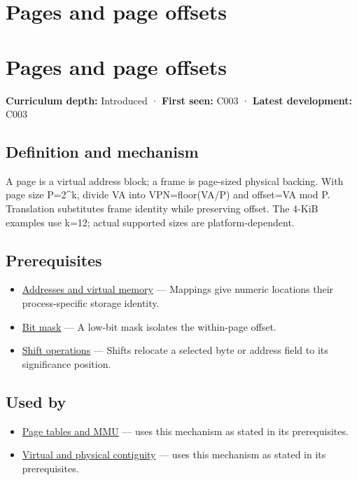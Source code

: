 \hypertarget{appendix-0c67cd5bf30a}{}
\section*{Pages and page offsets}
\section{Pages and page offsets}\label{appendix-0c67cd5bf30a-pages-and-page-offsets}

\textbf{Curriculum depth:} Introduced · \textbf{First seen:} C003 · \textbf{Latest development:} C003

\subsection{Definition and mechanism}\label{appendix-0c67cd5bf30a-definition-and-mechanism}

A page is a virtual address block; a frame is page-sized physical backing. With page size P=2\^{}k, divide VA into VPN=floor(VA/P) and offset=VA mod P. Translation substitutes frame identity while preserving offset. The 4-KiB examples use k=12; actual supported sizes are platform-dependent.

\subsection{Prerequisites}\label{appendix-0c67cd5bf30a-prerequisites}

\begin{itemize}
\tightlist
\item
  \hyperref[appendix-18ee4f913c3c]{Addresses and virtual memory} --- Mappings give numeric locations their process-specific storage identity.
\item
  \hyperref[appendix-dbe5905163c2]{Bit mask} --- A low-bit mask isolates the within-page offset.
\item
  \hyperref[appendix-73425b25118e]{Shift operations} --- Shifts relocate a selected byte or address field to its significance position.
\end{itemize}

\subsection{Used by}\label{appendix-0c67cd5bf30a-used-by}

\begin{itemize}
\tightlist
\item
  \hyperref[appendix-01e5905165c4]{Page tables and MMU} --- uses this mechanism as stated in its prerequisites.
\item
  \hyperref[appendix-f897c1ddac8f]{Virtual and physical contiguity} --- uses this mechanism as stated in its prerequisites.
\end{itemize}

